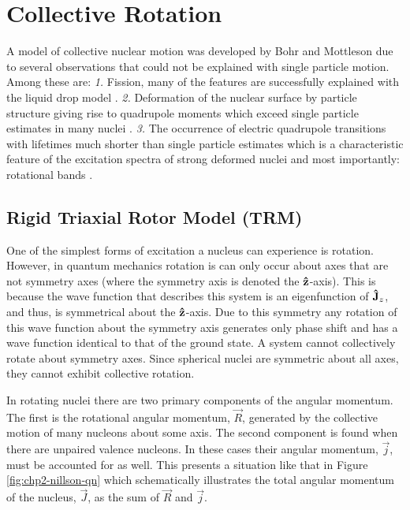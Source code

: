 \section{Collective Rotation}
\label{sec:models-rigid-rotor}
A model of collective nuclear motion was developed by Bohr and Mottleson \cite{bohrMottelsonArticle,bohrMottelson2} due to several observations that could not be explained with single particle motion. Among these are: \emph{1.} Fission, many of the features are successfully explained with the liquid drop model \cite{meitnerFissionProducts,fissionMechanism}. \emph{2.} Deformation of the nuclear surface by particle structure \cite{deformationPrediction} giving rise to quadrupole moments which exceed single particle estimates in many nuclei \cite{casimirQuadMoments,nuclearQuadMomentsAndShellStruc}. \emph{3.} The occurrence of electric quadrupole \gr{} transitions with lifetimes much shorter than single particle estimates \cite{nuclearIsomerClassification} which is a characteristic feature of the excitation spectra of strong deformed nuclei and most importantly: rotational bands \cite{QuadIsomerInterp}.
\subsection{Rigid Triaxial Rotor Model (TRM)}
\label{ssec:models-triaxial-rotor}
One of the simplest forms of excitation a nucleus can experience is rotation. However, in quantum mechanics rotation is can only occur about axes that are not symmetry axes (where the symmetry axis is denoted the $\boldsymbol{\hat{\textbf{z}}}$-axis). This is because the wave function that describes this system is an eigenfunction of $\boldsymbol{\hat{\textbf{J}}}_z$, and thus, is symmetrical about the $\boldsymbol{\hat{\textbf{z}}}$-axis. Due to this symmetry any rotation of this wave function about the symmetry axis generates only phase shift and has a wave function identical to that of the ground state. A system cannot collectively rotate about symmetry axes. Since spherical nuclei are symmetric about all axes, they cannot exhibit collective rotation.

In rotating nuclei there are two primary components of the angular momentum. The first is the rotational angular momentum, $\vec{R}$, generated by the collective motion of many nucleons about some axis. The second component is found when there are unpaired valence nucleons. In these cases their angular momentum, $\vec{j}$, must be accounted for as well. This presents a situation like that in Figure \ref{fig:chp2-nillson-qn} which schematically illustrates the total angular momentum of the nucleus, $\vec{J}$, as the sum of $\vec{R}$ and $\vec{j}$.

